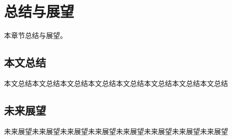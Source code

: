 \chapter{总结与展望}

本章节总结与展望。

\section{本文总结}

本文总结本文总结本文总结本文总结本文总结本文总结本文总结本文总结

\section{未来展望}

未来展望未来展望未来展望未来展望未来展望未来展望未来展望未来展望